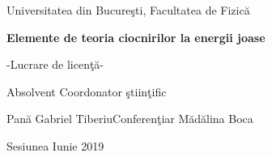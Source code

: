 \pagestyle{empty}

\begin{center}
\begin{Large}
Universitatea din Bucure\c sti, Facultatea de Fizic\u a
\end{Large}
\end{center}
\vspace*{5cm}

\begin{center}
\begin{Large}
{\bf Elemente de teoria ciocnirilor la energii joase}
\end{Large}
\end{center}

\begin{center}
-Lucrare de licen\c{t}\u{a}-
\end{center}

\vspace*{7cm}

\begin{large}
Absolvent  	 \hfill Coordonator \c{s}tiin\c{t}ific \hspace*{1.5cm}

Pan\u{a} Gabriel Tiberiu\hfill Conferen\c tiar M\u{a}d\u{a}lina Boca
\end{large}

\vfill

\begin{center}


Sesiunea Iunie 2019

\end{center}